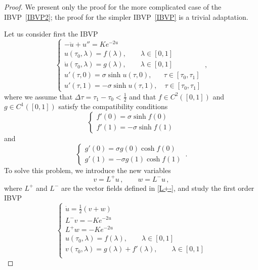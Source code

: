 \documentclass[10pt,a4paper]{amsart}
\begin{document}
\begin{proof}
We present only the proof for the more complicated case of the IBVP~\eqref{IBVP2}; the proof for the simpler IBVP~\eqref{IBVP} is a trivial adaptation.

Let us consider first the IBVP
\begin{equation} \label{IBVP3}
\begin{cases}
- \ddot{u} + u'' = K e^{- 2u} \\
u(\tau_0,\lambda)=f(\lambda), \quad \quad \lambda \in [0,1] \\
\dot{u}(\tau_0,\lambda)=g(\lambda), \quad \quad \lambda \in [0,1] \\
u'(\tau,0) = \sigma \sinh u(\tau,0), \quad \,\,\,\, \tau\in [\tau_0, \tau_1] \\
u'(\tau,1) = - \sigma \sinh u(\tau,1), \quad \tau\in [\tau_0, \tau_1]
\end{cases} \, ,
\end{equation}
where we assume that $\Delta \tau = \tau_1 - \tau_0 < \frac12$ and that $f \in C^2([0,1])$ and $g \in C^1([0,1])$ satisfy the compatibility conditions
\begin{equation} \label{compatibility1}
\begin{cases}
f'(0)=\sigma \sinh f(0) \\
f'(1)=-\sigma \sinh f(1)
\end{cases}
\end{equation}
and
\begin{equation} \label{compatibility2}
\begin{cases}
g'(0)=\sigma g(0) \cosh f(0) \\
g'(1)=-\sigma g(1) \cosh f(1)
\end{cases} \, .
\end{equation}
To solve this problem, we introduce the new variables
\begin{equation}
v = L^+ u \, , \qquad w = L^- u \, ,
\end{equation}
where $L^+$ and $L^-$ are the vector fields defined in \eqref{L+-}, and study the first order IBVP
\begin{equation} \label{IBVPfirstorder}
\begin{cases}
\dot{u} = \frac12 (v + w) \\
L^- v = - K e^{- 2u} \\
L^+ w = - K e^{- 2u} \\
u(\tau_0,\lambda)=f(\lambda), \quad \quad \lambda \in [0,1] \\
v(\tau_0,\lambda)=g(\lambda) + f'(\lambda), \quad \quad \lambda \in [0,1] \\

\end{cases}
\end{equation}
\end{proof}
\end{document}
